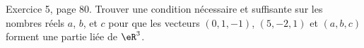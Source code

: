 \begin{exercice}\label{exoLineraire0015}

	Exercice 5, page 80. Trouver une condition nécessaire et suffisante sur les nombres réels $a$, $b$, et $c$ pour que les vecteurs $(0,1,-1)$, $(5,-2,1)$ et $(a,b,c)$ forment une partie liée de $\eR^3$.

\end{exercice}

